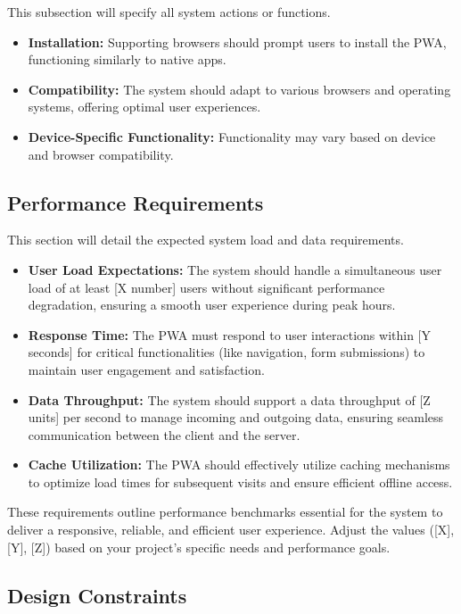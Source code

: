 \documentclass[12pt,a4paper, twosite]{article}
\begin{document}
This subsection will specify all system actions or functions.
\begin{itemize}
  \item \textbf{Installation: }Supporting browsers should prompt users to install the PWA, functioning similarly to native apps.
  \item \textbf{Compatibility: }The system should adapt to various browsers and operating systems, offering optimal user experiences.
  \item \textbf{Device-Specific Functionality: }Functionality may vary based on device and browser compatibility.
\end{itemize}

\subsection{Performance Requirements}
\label{sec:org94bc543}

This section will detail the expected system load and data requirements.

\begin{itemize}
  \item \textbf{User Load Expectations: }The system should handle a simultaneous user load of at least [X number] users without significant performance degradation, ensuring a smooth user experience during peak hours.
  \item \textbf{Response Time: }The PWA must respond to user interactions within [Y seconds] for critical functionalities (like navigation, form submissions) to maintain user engagement and satisfaction.
  \item \textbf{Data Throughput: }The system should support a data throughput of [Z units] per second to manage incoming and outgoing data, ensuring seamless communication between the client and the server.
  \item \textbf{Cache Utilization: }The PWA should effectively utilize caching mechanisms to optimize load times for subsequent visits and ensure efficient offline access.
\end{itemize}

These requirements outline performance benchmarks essential for the system to deliver a responsive, reliable, and efficient user experience. Adjust the values ([X], [Y], [Z]) based on your project's specific needs and performance goals.

\subsection{Design Constraints}
\label{sec:org49fe900}
\end{document}
